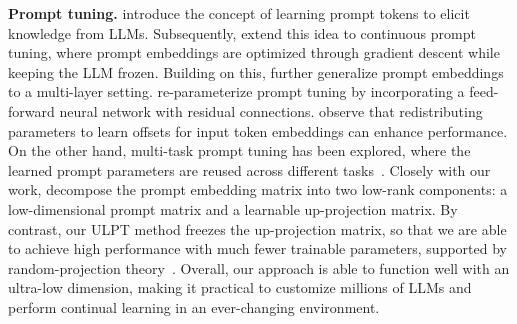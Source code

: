 \textbf{Prompt tuning.} 
\citet{shin-etal-2020-autoprompt} introduce the concept of learning prompt tokens to elicit knowledge from LLMs. Subsequently, \citet{lester-etal-2021-power} extend this idea to continuous prompt tuning, where prompt embeddings are optimized through gradient descent while keeping the LLM frozen. Building on this, \citet{li-liang-2021-prefix} further generalize prompt embeddings to a multi-layer setting. \citet{razdaibiedina-etal-2023-residual} re-parameterize prompt tuning by incorporating a feed-forward neural network with residual connections.  \citet{shi2024dept} observe that redistributing parameters to learn offsets for input token embeddings can enhance performance. On the other hand, multi-task prompt tuning has been explored, where the learned prompt parameters are reused across different tasks~\cite{wang2023multitask}. Closely with our work, \citet{xiao-etal-2023-decomposed} decompose the prompt embedding matrix into two low-rank components: a low-dimensional prompt matrix and a learnable up-projection matrix. By contrast, our ULPT method freezes the up-projection matrix, so that we are able to achieve high performance with much fewer trainable parameters, supported by random-projection theory~\cite{10.1145/502512.502546}. Overall, our approach is able to function well with an ultra-low dimension, making it practical to customize millions of LLMs and perform continual learning in an ever-changing environment.